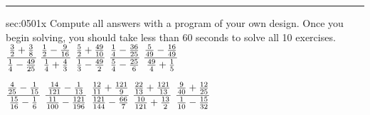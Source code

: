 \renewcommand{\columnseprule}{1.5pt}
\begin{multicols*}{2}
\rule[0.5\baselineskip]{0.4\textwidth}{1pt}
\noindent
\ExSection\label{sec:0501x}
\begin{exercises}{sec:0501x}
\prob[0501xA] Compute all answers with a program of your own design.  Once you begin solving, you should take less than 60 seconds to solve all 10 exercises.
\subprob $\cfrac{\frac{3}{2} + \frac{3}{8}}{\frac{1}{4} - \frac{49}{25}}$
\subprob $\cfrac{\frac{1}{2} - \frac{9}{16}}{\frac{1}{4} + \frac{4}{3}}$
\subprob $\cfrac{\frac{5}{2} + \frac{49}{10}}{\frac{1}{3} - \frac{49}{2}}$
\subprob $\cfrac{\frac{1}{4} - \frac{36}{25}}{\frac{5}{4}-\frac{25}{6}}$
\subprob $\cfrac{\frac{5}{49} - \frac{16}{49}}{\frac{49}{4} + \frac{1}{5}}$

\prob[0501xB]
\subprob $\cfrac{\frac{4}{25}-\frac{1}{15}}{\frac{15}{16}-\frac{1}{6}}$
\subprob $\cfrac{\frac{14}{121}-\frac{1}{13}}{\frac{11}{100}-\frac{121}{196}}$
\subprob $\cfrac{\frac{12}{11}+\frac{121}{9}}{\frac{121}{144}-\frac{66}{7}}$
\subprob $\cfrac{\frac{22}{13}+\frac{121}{13}}{\frac{10}{121}+\frac{13}{2}}$
\subprob $\cfrac{\frac{9}{40}+\frac{12}{25}}{\frac{1}{10}-\frac{15}{32}}$

\end{exercises}
\end{multicols*}